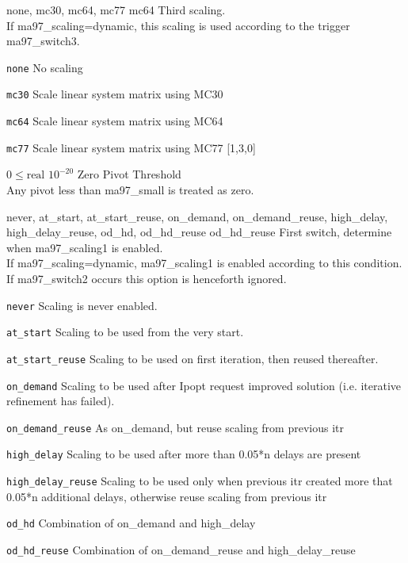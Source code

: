 %
{\ttfamily none, mc30, mc64, mc77}%
{mc64}%
{Third scaling.\\
If ma97\_scaling=dynamic, this scaling is used according to the trigger ma97\_switch3.}%
{\begin{list}{}{
\setlength{\parsep}{0em}
\setlength{\leftmargin}{5ex}
\setlength{\labelwidth}{2ex}
\setlength{\itemindent}{0ex}
\setlength{\topsep}{0pt}}
\item[\texttt{none}] No scaling
\item[\texttt{mc30}] Scale linear system matrix using MC30
\item[\texttt{mc64}] Scale linear system matrix using MC64
\item[\texttt{mc77}] Scale linear system matrix using MC77 [1,3,0]
\end{list}
}

%
{$0\leq\textrm{real}$}%
{$10^{-20}$}%
{Zero Pivot Threshold\\
Any pivot less than ma97\_small is treated as zero.}%
{}

%
{\ttfamily never, at\_start, at\_start\_reuse, on\_demand, on\_demand\_reuse, high\_delay, high\_delay\_reuse, od\_hd, od\_hd\_reuse}%
{od\_hd\_reuse}%
{First switch, determine when ma97\_scaling1 is enabled.\\
If ma97\_scaling=dynamic, ma97\_scaling1 is enabled according to this condition. If ma97\_switch2 occurs this option is henceforth ignored.}%
{\begin{list}{}{
\setlength{\parsep}{0em}
\setlength{\leftmargin}{5ex}
\setlength{\labelwidth}{2ex}
\setlength{\itemindent}{0ex}
\setlength{\topsep}{0pt}}
\item[\texttt{never}] Scaling is never enabled.
\item[\texttt{at\_start}] Scaling to be used from the very start.
\item[\texttt{at\_start\_reuse}] Scaling to be used on first iteration, then reused thereafter.
\item[\texttt{on\_demand}] Scaling to be used after Ipopt request improved solution (i.e. iterative refinement has failed).
\item[\texttt{on\_demand\_reuse}] As on\_demand, but reuse scaling from previous itr
\item[\texttt{high\_delay}] Scaling to be used after more than 0.05*n delays are present
\item[\texttt{high\_delay\_reuse}] Scaling to be used only when previous itr created more that 0.05*n additional delays, otherwise reuse scaling from previous itr
\item[\texttt{od\_hd}] Combination of on\_demand and high\_delay
\item[\texttt{od\_hd\_reuse}] Combination of on\_demand\_reuse and high\_delay\_reuse
\end{list}
}

